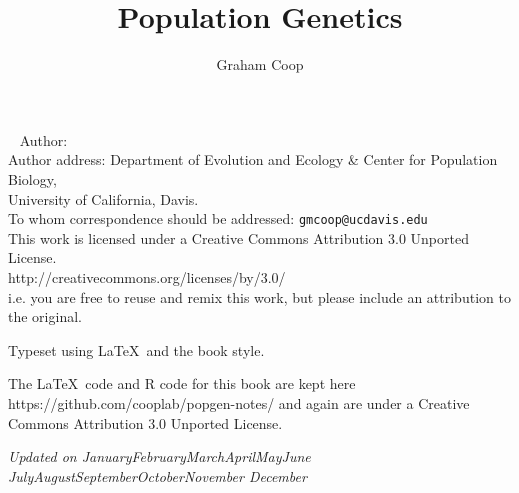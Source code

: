 \documentclass{tufte-book}
\newcommand{\monthyear}{%
  \ifcase\month\or January\or February\or March\or April\or May\or June\or
  July\or August\or September\or October\or November\or
  December\fi\space\number\year
}
\begin{document}
\title{Population Genetics}
\author{Graham Coop}




\date{}
\maketitle
\newpage

\begin{fullwidth}
~\vfill
\thispagestyle{empty}
\setlength{\parindent}{0pt}
\setlength{\parskip}{\baselineskip}
Author: \thanklessauthor\\
  \small Author address: Department of Evolution and Ecology \& Center for Population Biology,\\
 \small University of California, Davis.\\
  \small To whom correspondence should be addressed: \texttt{gmcoop@ucdavis.edu}\\
 \small This work is licensed under a Creative Commons Attribution 3.0 Unported License.\\
 \small http://creativecommons.org/licenses/by/3.0/ \\
 \small i.e. you are free to reuse and remix this work, but please include an attribution to the original.

\par  Typeset using \LaTeX~and the  book style. 

\par  The \LaTeX~code and R code for this book are kept here
https://github.com/cooplab/popgen-notes/ and again are under a Creative Commons Attribution 3.0 Unported License.

\par\textit{Updated on \monthyear}
\end{fullwidth}



\newpage
\tableofcontents

\newpage



%




%



\end{document}
